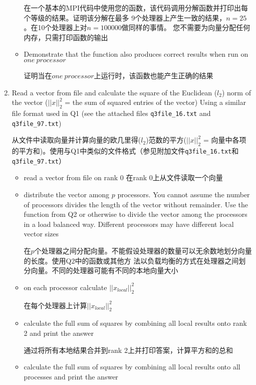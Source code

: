 \documentclass{article}
\begin{document}
\begin{enumerate}
\begin{itemize}
        在一个基本的MPI代码中使用您的函数，该代码调用分解函数并打印出每个等级的结果。证明该分解在最多
        9个处理器上产生一致的结果，$n = 25$。在10个处理器上对$n = 100000$做同样的事情。
        您不需要为向量分配任何内存，只需打印函数的输出
        \item Demonstrate that the function also produces correct results 
        when run on $one\:processor$

        证明当在$one\:processor$上运行时，该函数也能产生正确的结果
    \end{itemize}
    
    \newpage
    \item Read a vector from file and calculate the square of the Euclidean ($l_2$) norm of the vector ($||x||^2_2$ = the sum of squared entries of the vector) Using a similar file format used in Q1 (see the attached files \texttt{q3file\_16.txt} and \texttt{q3file\_97.txt})
    
    从文件中读取向量并计算向量的欧几里得($l_2$)范数的平方($||x||^2_2$ = 向量中各项的平方和)。使用与Q1中类似的文件格式（参见附加文件\texttt{q3file\_16.txt}和\texttt{q3file\_97.txt}）
    \begin{itemize}
        \item read a vector from file on rank 0
        在rank 0上从文件读取一个向量

        \item distribute the vector among $p$ processors. You cannot assume the number 
        of processors divides the length of the vector without remainder. Use the function 
        from Q2 or otherwise to divide the vector among the processors 
        in a load balanced way. Different processors may have different local vector sizes

        在$p$个处理器之间分配向量。不能假设处理器的数量可以无余数地划分向量的长度。使用Q2中的函数或其他方
        法以负载均衡的方式在处理器之间划分向量。不同的处理器可能有不同的本地向量大小
        \item on each processor calculate $||x_{local}||^2_2$
        
        在每个处理器上计算$||x_{local}||^2_2$
        \item calculate the full sum of squares by combining all local results onto 
        rank 2 and print the answer

        通过将所有本地结果合并到rank 2上并打印答案，计算平方和的总和
        \item calculate the full sum of squares by combining all local results onto all 
        processes and print the answer


\end{itemize}
\end{enumerate}
\end{document}
